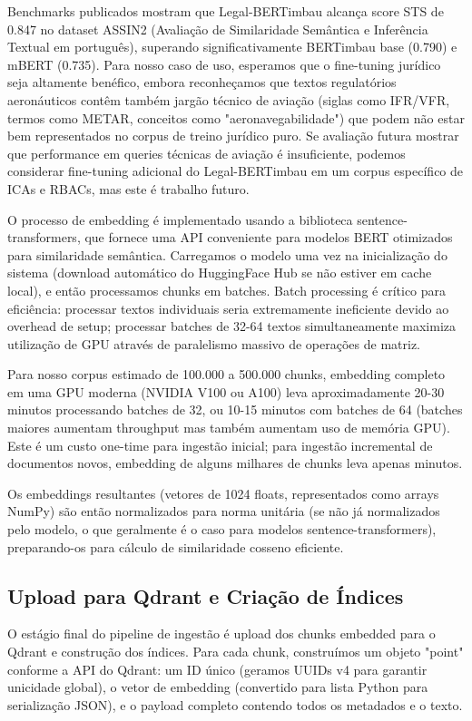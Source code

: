 \documentclass[12pt,a4paper]{article}
\begin{document}
Benchmarks publicados mostram que Legal-BERTimbau alcança score STS de 0.847 no dataset ASSIN2 (Avaliação de Similaridade Semântica e Inferência Textual em português), superando significativamente BERTimbau base (0.790) e mBERT (0.735). Para nosso caso de uso, esperamos que o fine-tuning jurídico seja altamente benéfico, embora reconheçamos que textos regulatórios aeronáuticos contêm também jargão técnico de aviação (siglas como IFR/VFR, termos como METAR, conceitos como "aeronavegabilidade") que podem não estar bem representados no corpus de treino jurídico puro. Se avaliação futura mostrar que performance em queries técnicas de aviação é insuficiente, podemos considerar fine-tuning adicional do Legal-BERTimbau em um corpus específico de ICAs e RBACs, mas este é trabalho futuro.

O processo de embedding é implementado usando a biblioteca sentence-transformers, que fornece uma API conveniente para modelos BERT otimizados para similaridade semântica. Carregamos o modelo uma vez na inicialização do sistema (download automático do HuggingFace Hub se não estiver em cache local), e então processamos chunks em batches. Batch processing é crítico para eficiência: processar textos individuais seria extremamente ineficiente devido ao overhead de setup; processar batches de 32-64 textos simultaneamente maximiza utilização de GPU através de paralelismo massivo de operações de matriz.

Para nosso corpus estimado de 100.000 a 500.000 chunks, embedding completo em uma GPU moderna (NVIDIA V100 ou A100) leva aproximadamente 20-30 minutos processando batches de 32, ou 10-15 minutos com batches de 64 (batches maiores aumentam throughput mas também aumentam uso de memória GPU). Este é um custo one-time para ingestão inicial; para ingestão incremental de documentos novos, embedding de alguns milhares de chunks leva apenas minutos.

Os embeddings resultantes (vetores de 1024 floats, representados como arrays NumPy) são então normalizados para norma unitária (se não já normalizados pelo modelo, o que geralmente é o caso para modelos sentence-transformers), preparando-os para cálculo de similaridade cosseno eficiente.

\subsection{Upload para Qdrant e Criação de Índices}

O estágio final do pipeline de ingestão é upload dos chunks embedded para o Qdrant e construção dos índices. Para cada chunk, construímos um objeto "point" conforme a API do Qdrant: um ID único (geramos UUIDs v4 para garantir unicidade global), o vetor de embedding (convertido para lista Python para serialização JSON), e o payload completo contendo todos os metadados e o texto.
\end{document}
